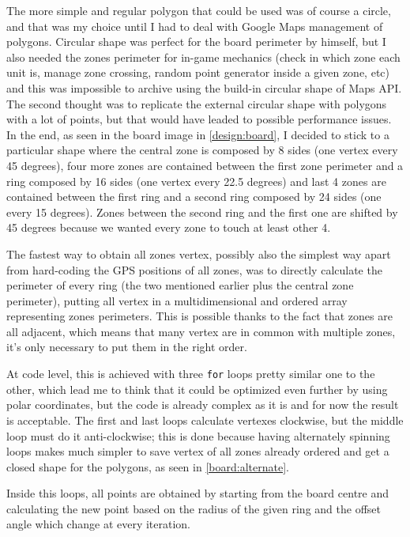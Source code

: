 			The more simple and regular polygon that could be used was of course a circle, and that was my choice until I had to deal with Google Maps management of polygons. Circular shape was perfect for the board perimeter by himself, but I also needed the zones perimeter for in-game mechanics (check in which zone each unit is, manage zone crossing, random point generator inside a given zone, etc) and this was impossible to archive using the build-in circular shape of Maps API.
			The second thought was to replicate the external circular shape with polygons with a lot of points, but that would have leaded to possible performance issues.
			In the end, as seen in the board image in \autoref{design:board}, I decided to stick to a particular shape where the central zone is composed by 8 sides (one vertex every 45 degrees), four more zones are contained between the first zone perimeter and a ring composed by 16 sides (one vertex every 22.5 degrees) and last 4 zones are contained between the first ring and a second ring composed by 24 sides (one every 15 degrees).
			Zones between the second ring and the first one are shifted by 45 degrees because we wanted every zone to touch at least other 4.
			
			The fastest way to obtain all zones vertex, possibly also the simplest way apart from hard-coding the GPS positions of all zones, was to directly calculate the perimeter of every ring (the two mentioned earlier plus the central zone perimeter), putting all vertex in a multidimensional and ordered array representing zones perimeters.
			This is possible thanks to the fact that zones are all adjacent, which means that many vertex are in common with multiple zones, it's only necessary to put them in the right order.
			
			At code level, this is achieved with three \lstinline|for| loops pretty similar one to the other, which lead me to think that it could be optimized even further by using polar coordinates, but the code is already complex as it is and for now the result is acceptable.
			The first and last loops calculate vertexes clockwise, but the middle loop must do it anti-clockwise; this is done because having alternately spinning loops makes much simpler to save vertex of all zones already ordered and get a closed shape for the polygons, as seen in \autoref{board:alternate}.
			
			
			Inside this loops, all points are obtained by starting from the board centre and calculating the new point based on the radius of the given ring and the offset angle which change at every iteration.
			
